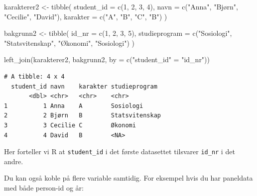 \documentclass[
  norsk,
  letterpaper,
  DIV=11,
  numbers=noendperiod]{scrreprt}
\newenvironment{Shaded}{\begin{snugshade}}{\end{snugshade}}
\newcommand{\AttributeTok}[1]{\textcolor[rgb]{0.40,0.45,0.13}{#1}}
\newcommand{\DecValTok}[1]{\textcolor[rgb]{0.68,0.00,0.00}{#1}}
\newcommand{\FunctionTok}[1]{\textcolor[rgb]{0.28,0.35,0.67}{#1}}
\newcommand{\NormalTok}[1]{\textcolor[rgb]{0.00,0.23,0.31}{#1}}
\newcommand{\OtherTok}[1]{\textcolor[rgb]{0.00,0.23,0.31}{#1}}
\newcommand{\StringTok}[1]{\textcolor[rgb]{0.13,0.47,0.30}{#1}}
\theoremstyle{definition}
\theoremstyle{remark}
\begin{document}
\begin{Shaded}
\begin{Highlighting}[]
\NormalTok{karakterer2 }\OtherTok{\textless{}{-}} \FunctionTok{tibble}\NormalTok{(}
  \AttributeTok{student\_id =} \FunctionTok{c}\NormalTok{(}\DecValTok{1}\NormalTok{, }\DecValTok{2}\NormalTok{, }\DecValTok{3}\NormalTok{, }\DecValTok{4}\NormalTok{),}
  \AttributeTok{navn =} \FunctionTok{c}\NormalTok{(}\StringTok{"Anna"}\NormalTok{, }\StringTok{"Bjørn"}\NormalTok{, }\StringTok{"Cecilie"}\NormalTok{, }\StringTok{"David"}\NormalTok{),}
  \AttributeTok{karakter =} \FunctionTok{c}\NormalTok{(}\StringTok{"A"}\NormalTok{, }\StringTok{"B"}\NormalTok{, }\StringTok{"C"}\NormalTok{, }\StringTok{"B"}\NormalTok{)}
\NormalTok{)}

\NormalTok{bakgrunn2 }\OtherTok{\textless{}{-}} \FunctionTok{tibble}\NormalTok{(}
  \AttributeTok{id\_nr =} \FunctionTok{c}\NormalTok{(}\DecValTok{1}\NormalTok{, }\DecValTok{2}\NormalTok{, }\DecValTok{3}\NormalTok{, }\DecValTok{5}\NormalTok{),}
  \AttributeTok{studieprogram =} \FunctionTok{c}\NormalTok{(}\StringTok{"Sosiologi"}\NormalTok{, }\StringTok{"Statsvitenskap"}\NormalTok{, }\StringTok{"Økonomi"}\NormalTok{, }\StringTok{"Sosiologi"}\NormalTok{)}
\NormalTok{)}

\FunctionTok{left\_join}\NormalTok{(karakterer2, bakgrunn2, }\AttributeTok{by =} \FunctionTok{c}\NormalTok{(}\StringTok{"student\_id"} \OtherTok{=} \StringTok{"id\_nr"}\NormalTok{))}
\end{Highlighting}
\end{Shaded}

\begin{verbatim}
# A tibble: 4 x 4
  student_id navn    karakter studieprogram 
       <dbl> <chr>   <chr>    <chr>         
1          1 Anna    A        Sosiologi     
2          2 Bjørn   B        Statsvitenskap
3          3 Cecilie C        Økonomi       
4          4 David   B        <NA>          
\end{verbatim}

Her forteller vi R at \texttt{student\_id} i det første datasettet
tilsvarer \texttt{id\_nr} i det andre.

Du kan også koble på flere variable samtidig. For eksempel hvis du har
paneldata med både person-id og år:
\end{document}
